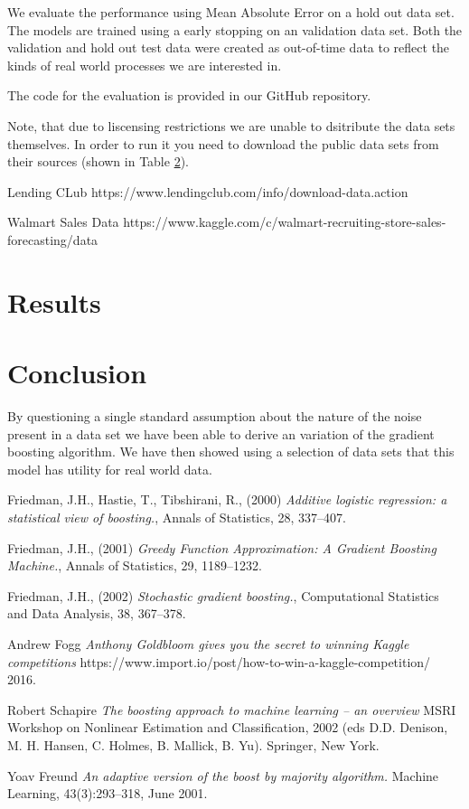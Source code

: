 \documentclass[11pt,twoside,a4paper]{article}
\begin{document}
We evaluate the performance using Mean Absolute Error on a hold out data set.
The models are trained using a early stopping on an validation data set. Both
the validation and hold out test data were created as out-of-time data to reflect
the kinds of real world processes we are interested in. 

The code for the evaluation is provided in our GitHub repository. 


Note, that due to liscensing restrictions we are unable to dsitribute the data sets
themselves. In order to run
it you need to download the public data sets from their sources (shown in Table \ref{}).

Lending CLub
https://www.lendingclub.com/info/download-data.action

Walmart Sales Data
https://www.kaggle.com/c/walmart-recruiting-store-sales-forecasting/data


\section{Results}



\section{Conclusion}

By questioning a single standard assumption about the nature of the noise present in a data set
we have been able to derive an variation of the gradient boosting algorithm. We have then showed
using a selection of data sets that this model has utility for real world data.


  \begin{thebibliography}{1}

   Friedman, J.H., Hastie, T., Tibshirani, R., (2000) 
	{\em  Additive logistic regression: a statistical view of boosting.},
	Annals of Statistics, 28, 337–407.

   Friedman, J.H., (2001) {\em Greedy Function Approximation: A Gradient Boosting Machine.},
	Annals of Statistics, 29, 1189–1232.

   Friedman, J.H., (2002) {\em  Stochastic gradient boosting.},
	Computational Statistics and Data Analysis, 38, 367–378.

   Andrew Fogg {\em Anthony Goldbloom gives you the secret to winning Kaggle competitions} 
	{https://www.import.io/post/how-to-win-a-kaggle-competition/}
	2016.

   Robert Schapire {\em The boosting approach to machine learning – an overview}
	MSRI Workshop on Nonlinear Estimation and Classification, 2002 (eds D.D.
	Denison, M. H. Hansen, C. Holmes, B. Mallick, B. Yu). Springer, New York.

   Yoav Freund {\em An adaptive version of the boost by majority algorithm.}  
	Machine Learning, 43(3):293–318, June 2001.

  \end{thebibliography}
\end{document}
